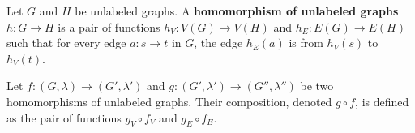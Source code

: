 \begin{definition}
    \label{def:unlabeled_graph:homomorphism}
    Let \( G \) and \( H \) be unlabeled graphs. A \textbf{homomorphism of unlabeled graphs} $h: G \to H$ is a pair of functions $h_V: V(G) \to V(H) $ and $h_E: E(G) \to E(H)$ such that for every edge \( a: s \to t \) in \( G \), the edge \( h_E(a) \) is from \( h_V(s) \) to \( h_V(t) \).
\end{definition}


\begin{definition}
    \label{def:graph:composition}
    Let $f: (G,\lambda) \to (G',\lambda')$ and $g: (G',\lambda') \to (G'',\lambda'')$ be two homomorphisms of unlabeled graphs. Their composition, denoted $g \circ f$, is defined as the pair of functions $g_V \circ f_V$ and $g_E \circ f_E$.
\end{definition}